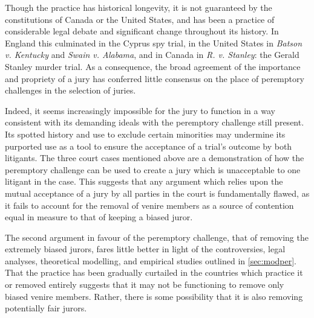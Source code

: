 Though the practice has historical longevity, it is not guaranteed by the constitutions of Canada or the United States, and has
been a practice of considerable legal debate and significant change throughout its history. In England this culminated in the
Cyprus spy trial, in the United States in \textit{Batson v. Kentucky} and \textit{Swain v. Alabama}, and in Canada in
\textit{R. v. Stanley}: the Gerald Stanley  murder trial. As a consequence, the broad agreement of the importance and propriety of
a jury has conferred little consensus on the place of peremptory challenges in the selection of juries.

Indeed, it seems increasingly impossible for the jury to function in a way consistent with its demanding ideals with the
peremptory challenge still present. Its spotted history and use to exclude certain minorities may undermine its purported use as a
tool to ensure the acceptance of a trial's outcome by both litigants. The three court cases mentioned above are a demonstration of 
how the peremptory challenge can be used to create a jury which is unacceptable to one litigant in the case. This suggests that
any argument which relies upon the mutual acceptance of a jury by all parties in the court is fundamentally flawed, as it fails to
account for the removal of venire members as a source of contention equal in measure to that of keeping a biased juror.

The second argument in favour of the peremptory challenge, that of removing the extremely biased jurors, fares little better in
light of the controversies, legal analyses, theoretical modelling, and empirical studies outlined in \ref{sec:modper}. That the
practice has been gradually curtailed in the countries which practice it or removed entirely suggests that it may not be
functioning to remove only biased venire members. Rather, there is some possibility that it is also removing potentially fair
jurors.